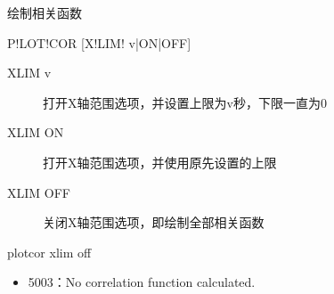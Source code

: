 \label{spe:plotcor}

绘制相关函数

\begin{SACSTX}
P!LOT!COR [X!LIM! v|ON|OFF]
\end{SACSTX}

\begin{description}
\item [XLIM v] 打开X轴范围选项，并设置上限为v秒，下限一直为0
\item [XLIM ON] 打开X轴范围选项，并使用原先设置的上限
\item [XLIM OFF] 关闭X轴范围选项，即绘制全部相关函数
\end{description}

\begin{SACDFT}
plotcor xlim off
\end{SACDFT}

\begin{itemize}
\item 5003：No correlation function calculated.
\end{itemize}

